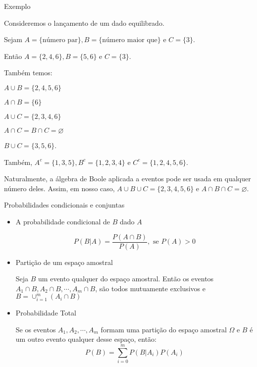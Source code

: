 \documentclass{beamer}
\begin{document}
\begin{frame}
\begin{block}{Exemplo}

	Consideremos o lançamento de um dado equilibrado.
	
	Sejam $A= \{\text{número par}\} , B = \{\text{número maior que}\} \text{ e } C =\{ 3 \}$.
	
	Então $A =\{ 2,4,6 \} , B = \{ 5,6 \} \text{ e } C = \{ 3 \}$.

	Também temos:

	$A \cup B =\{ 2,4,5,6 \}$
	
	$A \cap B= \{ 6 \}$
	
	$A \cup C = \{ 2,3,4,6 \}$
	
	$A \cap C = B \cap C = \varnothing$
	
	$B \cup C = \{ 3,5,6 \}$.

	Também, $A^c = \{ 1,3,5\} , B^c = \{ 1,2,3,4 \} \text{ e } C^c = \{ 1,2,4,5,6\}$.

	Naturalmente, a álgebra de Boole aplicada a eventos pode ser usada em qualquer número deles. Assim,
em nosso caso, $A \cup B \cup C = \{2,3,4,5,6\} \text{ e } A \cap B \cap C = \varnothing$.
	
\end{block}
\end{frame}



\begin{frame}{Probabilidades condicionais e conjuntas}
\begin{itemize}
	\item A probabilidade condicional de $B$ dado $A$

	\begin{equation}
		P(B | A) = \frac{P(A \cap B)}{P(A)},\text{ se } P(A) > 0
	\end{equation}

	\item Partição de um espaço amostral

	Seja $B$ um evento qualquer do espaço amostral. Então os eventos $A_1 \cap B, A_2 \cap B,\cdots, A_m \cap B$, são todos
	mutuamente exclusivos e $B=\cup_{i=1}^{m}(A_i \cap B)$
	
	\item Probabilidade Total
	
	Se os eventos $A_1,A_2,\cdots,A_m$ formam uma partição do espaço amostral $\Omega$ e $B$ é um outro evento qualquer
	desse espaço, então:
	\begin{equation}
		P(B) = \sum\limits_{i=0}^{m}P(B|A_i)P(A_i)
	\end{equation}
\end{itemize}
\end{frame}
\end{document}
